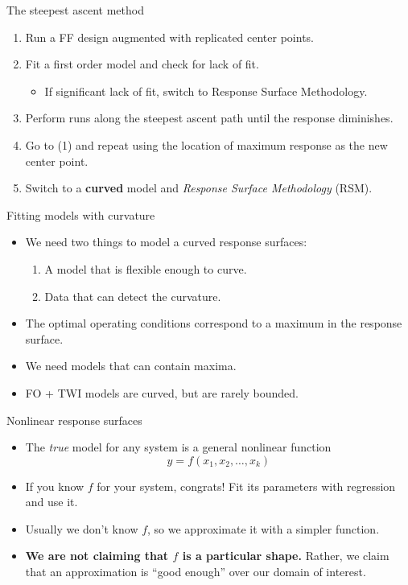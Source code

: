 \documentclass[10pt]{beamer}
\begin{document}
{\begin{frame}{The steepest ascent method}
\begin{enumerate}
  \item<1-> Run a FF design augmented with replicated center points.
  \item<2-> Fit a first order model and check for lack of fit.
    \begin{itemize}
      \item If significant lack of fit, switch to Response Surface Methodology.
    \end{itemize}
  \item<3-> Perform runs along the steepest ascent path until the response diminishes.
  \item<4-> Go to (1) and repeat using the location of maximum response as the new center point.
  \item<5-> Switch to a \textbf{curved} model and \emph{Response Surface Methodology} (RSM).
\end{enumerate}

\end{frame}

\begin{frame}{Fitting models with curvature}

\begin{itemize}
  \item We need two things to model a curved response surfaces:
    \begin{enumerate}
      \item A model that is flexible enough to curve.
      \item Data that can detect the curvature.
    \end{enumerate}
  \item<2-> The optimal operating conditions correspond to a maximum in the response surface.
  \item<2-> We need models that can contain maxima.
  \item<3-> FO + TWI models are curved, but are rarely bounded.
\end{itemize}


\end{frame}

\begin{frame}{Nonlinear response surfaces}

\begin{itemize}[<+->]
	\item The \emph{true} model for any system is a general nonlinear function
		\[ y = f(x_1, x_2, \ldots, x_k) \]
	\item If you know $f$ for your system, congrats! Fit its parameters with regression and use it.
	\item Usually we don't know $f$, so we approximate it with a simpler function.
	\item \textbf{We are not claiming that $f$ is a particular shape.} Rather, we claim that an approximation is ``good enough'' over our domain of interest.
\end{itemize}


\end{frame}}
\end{document}
